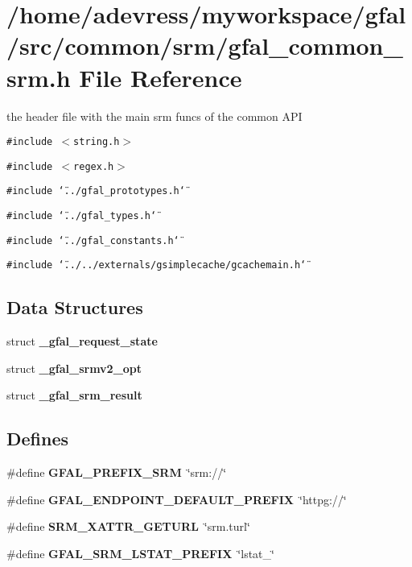 \section{/home/adevress/myworkspace/gfal/src/common/srm/gfal\_\-common\_\-srm.h File Reference}
\label{gfal__common__srm_8h}
the header file with the main srm funcs of the common API 

{\tt \#include $<$string.h$>$}\par
{\tt \#include $<$regex.h$>$}\par
{\tt \#include \char`\"{}../gfal\_\-prototypes.h\char`\"{}}\par
{\tt \#include \char`\"{}../gfal\_\-types.h\char`\"{}}\par
{\tt \#include \char`\"{}../gfal\_\-constants.h\char`\"{}}\par
{\tt \#include \char`\"{}../../externals/gsimplecache/gcachemain.h\char`\"{}}\par
\subsection*{Data Structures}
\begin{CompactItemize}
\item 
struct \bf{\_\-gfal\_\-request\_\-state}
\item 
struct \textbf{\_\-gfal\_\-srmv2\_\-opt}
\item 
struct \textbf{\_\-gfal\_\-srm\_\-result}
\end{CompactItemize}
\subsection*{Defines}
\begin{CompactItemize}
\item 
\#define \textbf{GFAL\_\-PREFIX\_\-SRM}~\char`\"{}srm://\char`\"{}\label{gfal__common__srm_8h_c163cc407dc64638a5f13fe1d7ceb858}

\item 
\#define \textbf{GFAL\_\-ENDPOINT\_\-DEFAULT\_\-PREFIX}~\char`\"{}httpg://\char`\"{}\label{gfal__common__srm_8h_496c8a18054866dcb27ae3f3397ac303}

\item 
\#define \textbf{SRM\_\-XATTR\_\-GETURL}~\char`\"{}srm.turl\char`\"{}\label{gfal__common__srm_8h_cfb5da2e23958bb6b8ae0f60135fbfd7}

\item 
\#define \textbf{GFAL\_\-SRM\_\-LSTAT\_\-PREFIX}~\char`\"{}lstat\_\-\char`\"{}\label{gfal__common__srm_8h_93786bf5408138dc3fe440112663d89a}

\end{CompactItemize}
